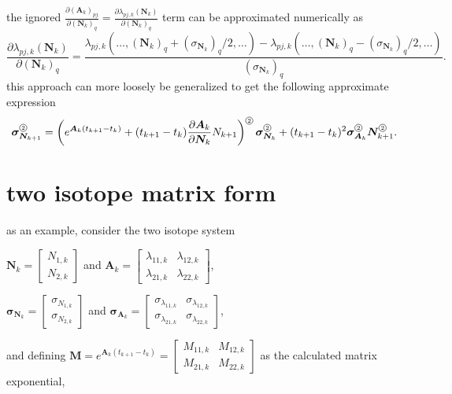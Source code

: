\documentclass[a4paper]{article}
\newcommand*\Hada{\tikz[baseline=(char.base)]{\node[shape=circle,draw,inner sep=0.7pt] (char) {\tiny{2}};}}
\begin{document}
the ignored $\frac{\partial (\bm{A}_k)_{pj}}{\partial (\bm{N}_k)_q}=\frac{\partial \lambda_{pj,k}(\bm{N}_k) }{\partial (\bm{N}_k)_q}$ term can be approximated numerically as
\begin{equation}
  \frac{\partial \lambda_{pj,k}(\bm{N}_k)}{\partial (\bm{N}_k)_q}
  = \frac{\lambda_{pj,k}(\ldots,(\bm{N}_k)_q+(\sigma_{\bm{N}_k})_q/2,\ldots) - \lambda_{pj,k}(\ldots,(\bm{N}_k)_q-(\sigma_{\bm{N}_k})_q/2,\ldots) }{(\sigma_{\bm{N}_k})_q}.
\end{equation}
this approach can more loosely be generalized to get the following approximate expression
\begin{equation}
  \label{eq:expanded-hada-form}
  \begin{split}
  \bm{\sigma}_{\bm{N}_{k+1}}^{\Hada}
  &=\left(e^{\bm{A}_k(t_{k+1}-t_k)}+(t_{k+1}-t_k)\frac{\partial \bm{A}_k}{\partial \bm{N}_k}N_{k+1}\right)^{\Hada}\bm{\sigma}_{\bm{N}_k}^{\Hada}
  + (t_{k+1}-t_k)^2 \bm{\sigma}_{\bm{A}_k}^{\Hada}\bm{N}_{k+1}^{\Hada}. \\
  \end{split}
\end{equation}


\section*{two isotope matrix form}
as an example, consider the two isotope system

 $\bm{N}_k=\begin{bmatrix} N_{1,k} \\ N_{2,k} \end{bmatrix}$ and
 $\bm{A}_k=\begin{bmatrix}
 \lambda_{11,k} & \lambda_{12,k}\\
 \lambda_{21,k} & \lambda_{22,k}
 \end{bmatrix}$,

 $\bm{\sigma}_{\bm{N}_k}=\begin{bmatrix} \sigma_{N_{1,k}} \\ \sigma_{N_{2,k}} \end{bmatrix}$ and
 $\bm{\sigma}_{\bm{A}_k}=\begin{bmatrix}
 \sigma_{\lambda_{11,k}} & \sigma_{\lambda_{12,k}}\\
 \sigma_{\lambda_{21,k}} & \sigma_{\lambda_{22,k}}
 \end{bmatrix}$,

 and defining $\bm{M}=e^{\bm{A}_k(t_{k+1}-t_k)}=\begin{bmatrix}
 M_{11,k} & M_{12,k}\\
 M_{21,k} & M_{22,k}
 \end{bmatrix}$ as the calculated matrix exponential,
\end{document}
